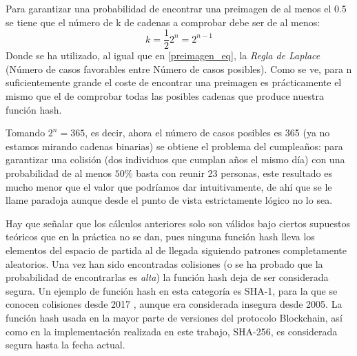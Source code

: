 Para garantizar una probabilidad de encontrar una preimagen de al menos el 0.5 se tiene que el número de k de cadenas a comprobar debe ser de al menos:
\begin{equation}
k=\frac{1}{2}2^{n} = 2^{n-1}
\end{equation}
Donde se ha utilizado, al igual que en \ref{preimagen_eq}, la \textit{Regla de Laplace} (Número de casos favorables entre Número de casos posibles).  Como se ve, para n suficientemente grande el coste de encontrar una preimagen es prácticamente el mismo que el de comprobar todas las posibles cadenas que produce nuestra función hash.

Tomando $2^{n} = 365$, es decir, ahora el número de casos posibles es 365 (ya no estamos mirando cadenas binarias) se obtiene el problema del cumpleaños: para garantizar una colisión (dos individuos que cumplan años el mismo día) con una probabilidad de al menos $50\%$ basta con reunir 23 personas, este resultado es mucho menor que el valor que podríamos dar intuitivamente, de ahí que se le llame paradoja aunque desde el punto de vista estrictamente lógico no lo sea.


Hay que señalar que los cálculos anteriores solo son válidos bajo ciertos supuestos teóricos que en la práctica no se dan, pues ninguna función hash lleva los elementos del espacio de partida al de llegada siguiendo patrones completamente aleatorios. Una vez han sido encontradas colisiones (o se ha probado que la probabilidad de encontrarlas es \textit{alta}) la función hash deja de ser considerada segura. Un ejemplo de función hash en esta categoría es SHA-1, para la que se conocen colisiones desde 2017 \citep{sha-1}, aunque era considerada insegura desde 2005. 
La función hash usada en la mayor parte de versiones del protocolo Blockchain, así como en la implementación realizada en este trabajo, SHA-256,
es considerada segura hasta la fecha actual.







